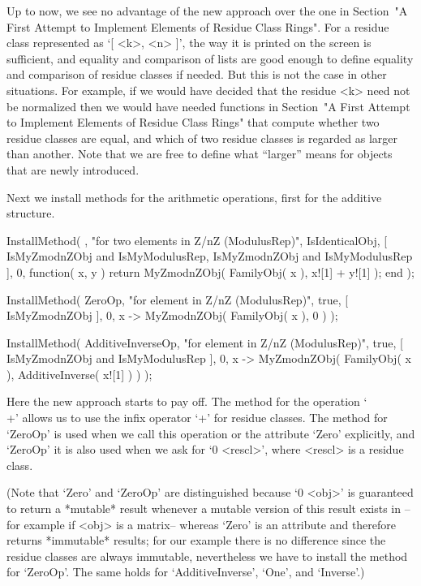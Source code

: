 Up to now, we see no advantage of the new approach over the one in
Section~"A First Attempt to Implement Elements of Residue Class Rings".
For a residue class represented as `[ <k>, <n> ]', the way it is printed
on the screen is sufficient, and equality and comparison of lists are
good enough to define equality and comparison of residue classes if needed.
But this is not the case in other situations.
For example, if we would have decided that the residue <k> need not be
normalized then we would have needed functions in
Section~"A First Attempt to Implement Elements of Residue Class Rings"
that compute whether two residue classes are equal, and which of two
residue classes is regarded as larger than another.
Note that we are free to define what ``larger'' means for objects that
are newly introduced.

Next we install methods for the arithmetic operations,
first for the additive structure.

\begintt
InstallMethod( \+,
    "for two elements in Z/nZ (ModulusRep)",
    IsIdenticalObj,
    [ IsMyZmodnZObj and IsMyModulusRep, IsMyZmodnZObj and IsMyModulusRep ],
    0,
    function( x, y )
    return MyZmodnZObj( FamilyObj( x ), x![1] + y![1] );
    end );

InstallMethod( ZeroOp,
    "for element in Z/nZ (ModulusRep)",
    true,
    [ IsMyZmodnZObj ], 0,
    x -> MyZmodnZObj( FamilyObj( x ), 0 ) );

InstallMethod( AdditiveInverseOp,
    "for element in Z/nZ (ModulusRep)",
    true,
    [ IsMyZmodnZObj and IsMyModulusRep ], 0,
    x -> MyZmodnZObj( FamilyObj( x ), AdditiveInverse( x![1] ) ) );
\endtt

Here the new approach starts to pay off.
The method for the operation `\\+' allows us to use the infix
operator `+' for residue classes.
The method for `ZeroOp' is used when we call this operation or the
attribute `Zero' explicitly,
and `ZeroOp' it is also used when we ask for `0 \* <rescl>',
where <rescl> is a residue class.

(Note that `Zero' and `ZeroOp' are distinguished
because `0 \* <obj>' is guaranteed to return a *mutable* result whenever
a mutable version of this result exists in {\GAP} --for example if <obj>
is a matrix-- whereas `Zero' is an attribute and therefore returns
*immutable* results;
for our example there is no difference since the residue classes are
always immutable,
nevertheless we have to install the method for `ZeroOp'.
The same holds for `AdditiveInverse', `One', and `Inverse'.)


